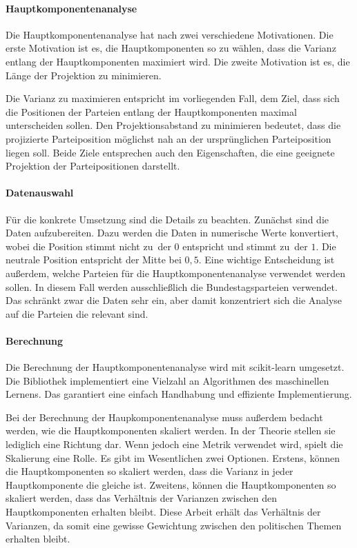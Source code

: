 \paragraph{Hauptkomponentenanalyse}
Die Hauptkomponentenanalyse hat nach \citet{bishop2006pattern} zwei verschiedene Motivationen. Die erste Motivation ist es, die Hauptkomponenten so zu wählen, dass die Varianz entlang der Hauptkomponenten maximiert wird.
Die zweite Motivation ist es, die Länge der Projektion zu minimieren. \citep[Kap.\,12.1, S.\,561-570]{bishop2006pattern}

Die Varianz zu maximieren entspricht im vorliegenden Fall, dem Ziel, dass sich die Positionen der Parteien entlang der Hauptkomponenten maximal unterscheiden sollen.
Den Projektionsabstand zu minimieren bedeutet, dass die projizierte Parteiposition möglichst nah an der ursprünglichen Parteiposition liegen soll.
Beide Ziele entsprechen auch den Eigenschaften, die eine geeignete Projektion der Parteipositionen darstellt.

\paragraph{Datenauswahl}
Für die konkrete Umsetzung sind die Details zu beachten.
Zunächst sind die Daten aufzubereiten. Dazu werden die Daten in numerische Werte konvertiert, wobei die Position \glqq stimmt nicht zu\grqq\ der $0$ entspricht und \glqq stimmt zu\grqq\ der $1$.
Die neutrale Position entspricht der Mitte bei $0,5$.
Eine wichtige Entscheidung ist außerdem, welche Parteien für die Hauptkomponentenanalyse verwendet werden sollen.
In diesem Fall werden ausschließlich die Bundestagsparteien verwendet.
Das schränkt zwar die Daten sehr ein, aber damit konzentriert sich die Analyse auf die Parteien die relevant sind.

\paragraph{Berechnung}
Die Berechnung der Hauptkomponentenanalyse wird mit scikit-learn \citep{scikit-learn} umgesetzt. Die Bibliothek implementiert eine Vielzahl an Algorithmen des maschinellen Lernens. Das garantiert eine einfach Handhabung und effiziente Implementierung.

Bei der Berechnung der Haupkomponentenanalyse muss außerdem bedacht werden, wie die Hauptkomponenten skaliert werden. In der Theorie stellen sie lediglich eine Richtung dar. Wenn jedoch eine Metrik verwendet wird, spielt die Skalierung eine Rolle. Es gibt im Wesentlichen zwei Optionen. Erstens, können die Hauptkomponenten so skaliert werden, dass die Varianz in jeder Hauptkomponente die gleiche ist. Zweitens, können die Hauptkomponenten so skaliert werden, dass das Verhältnis der Varianzen zwischen den Hauptkomponenten erhalten bleibt. Diese Arbeit erhält das Verhältnis der Varianzen, da somit eine gewisse Gewichtung zwischen den politischen Themen erhalten bleibt.

